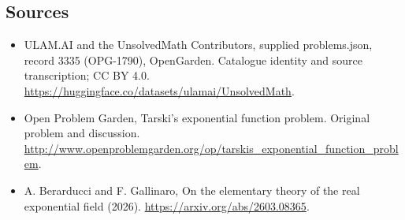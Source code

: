 \documentclass[11pt,a4paper]{article}
\begin{document}
\subsection{Sources}
\begin{itemize}
\item[S1] ULAM.AI and the UnsolvedMath Contributors, supplied problems.json, record 3335 (OPG-1790), OpenGarden. Catalogue identity and source transcription; CC BY 4.0.
\url{https://huggingface.co/datasets/ulamai/UnsolvedMath}.
\item[S2] Open Problem Garden, Tarski's exponential function problem. Original problem and discussion.
\url{http://www.openproblemgarden.org/op/tarskis_exponential_function_problem}.
\item[S3] A. Berarducci and F. Gallinaro, On the elementary theory of the real exponential field (2026).
\url{https://arxiv.org/abs/2603.08365}.
\end{itemize}
\end{document}
